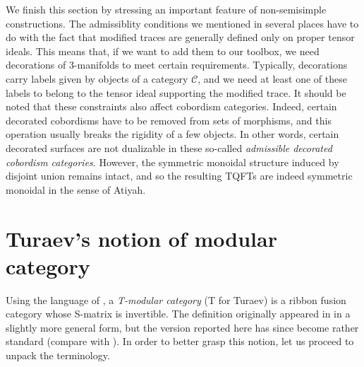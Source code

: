 \documentclass[a4paper,reqno]{amsart}
\theoremstyle{definition}
\theoremstyle{remark}
\newcommand{\calC}{\mathcal{C}}
\begin{document}
We finish this section by stressing an important feature of non-semisimple constructions. The admissiblity conditions we mentioned in several places have to do with the fact that modified traces are generally defined only on proper tensor ideals. This means that, if we want to add them to our toolbox, we need decorations of 3-manifolds to meet certain requirements. Typically, decorations carry labels given by objects of a category $\calC$, and we need at least one of these labels to belong to the tensor ideal supporting the modified trace. It should be noted that these constraints also affect cobordism categories. Indeed, certain decorated cobordisms have to be removed from sets of morphisms, and this operation usually breaks the rigidity of a few objects. In other words, certain decorated surfaces are not dualizable in these so-called \textit{admissible decorated cobordism categories}. However, the symmetric monoidal structure induced by disjoint union remains intact, and so the resulting TQFTs are indeed symmetric monoidal in the sense of Atiyah.

\section{Turaev's notion of modular category}\label{S:T-mod_cat}

Using the language of \cite{EGNO15}, a \textit{T-modular category} (T for Turaev) is a ribbon fusion category whose S-matrix is invertible. The definition originally appeared in \cite[Sec.~II.1.2]{T94} in a slightly more general form, but the version reported here has since become rather standard (compare with \cite{BK01,TV17}). In order to better grasp this notion, let us proceed to unpack the terminology. 
\end{document}
